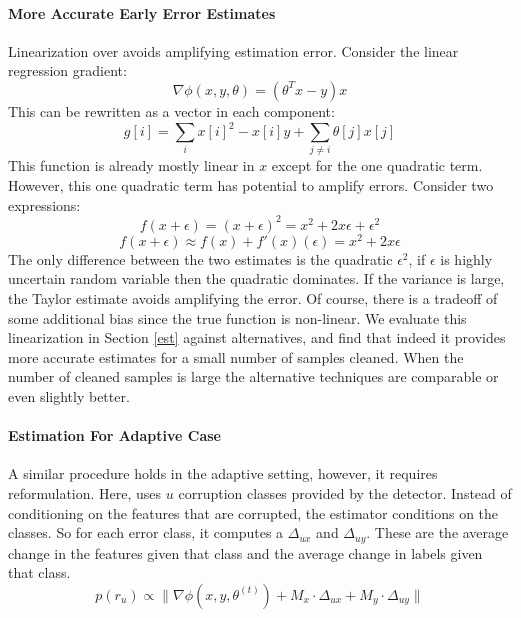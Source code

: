 \paragraph{More Accurate Early Error Estimates}\label{acc}
Linearization over avoids amplifying estimation error.
Consider the linear regression gradient:
\[
\nabla\phi(x,y,\theta) = (\theta^Tx - y)x
\]
This can be rewritten as a vector in each component:
\[
g[i] = \sum_{i} x[i]^2-x[i]y + \sum_{j \ne i} \theta[j]x[j]
\]
This function is already mostly linear in $x$ except for the one quadratic term.
However, this one quadratic term has potential to amplify errors.
Consider two expressions:
\[
f(x+\epsilon) = (x+\epsilon)^2 = x^2 + 2x\epsilon + \epsilon^2
\]
\[
f(x+\epsilon) \approx f(x) + f'(x)(\epsilon) = x^2 + 2x\epsilon
\]
The only difference between the two estimates is the quadratic $\epsilon^2$, if $\epsilon$ is highly uncertain random variable then the quadratic dominates.
If the variance is large, the Taylor estimate avoids amplifying the error.
Of course, there is a tradeoff of some additional bias since the true function is non-linear.
We evaluate this linearization in Section \ref{est} against alternatives, and find that indeed it provides more accurate estimates for a small number of samples cleaned.
When the number of cleaned samples is large the alternative techniques are comparable or even slightly better.
\fi

\paragraph{Estimation For Adaptive Case}
A similar procedure holds in the adaptive setting, however, it requires reformulation.
Here, \sys uses $u$ corruption classes provided by the detector.
Instead of conditioning on the features that are corrupted, the estimator conditions on the classes.
So for each error class, it computes a $\Delta_{ux}$ and $\Delta_{uy}$.
These are the average change in the features given that class and the average change in labels given that class.
\[
p(r_u)\propto\|\nabla\phi(x,y,\theta^{(t)}) + M_x \cdot \Delta_{ux} +  M_y \cdot \Delta_{uy}\|
\] 

